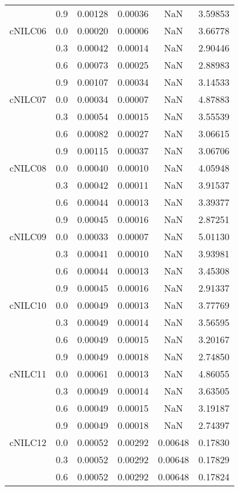 \begin{longtable}{cccccc}
        & 0.9 & 0.00128 & 0.00036 & NaN & 3.59853 \\
cNILC06 & 0.0 & 0.00020 & 0.00006 & NaN & 3.66778 \\
        & 0.3 & 0.00042 & 0.00014 & NaN & 2.90446 \\
        & 0.6 & 0.00073 & 0.00025 & NaN & 2.88983 \\
        & 0.9 & 0.00107 & 0.00034 & NaN & 3.14533 \\
cNILC07 & 0.0 & 0.00034 & 0.00007 & NaN & 4.87883 \\
        & 0.3 & 0.00054 & 0.00015 & NaN & 3.55539 \\
        & 0.6 & 0.00082 & 0.00027 & NaN & 3.06615 \\
        & 0.9 & 0.00115 & 0.00037 & NaN & 3.06706 \\
cNILC08 & 0.0 & 0.00040 & 0.00010 & NaN & 4.05948 \\
        & 0.3 & 0.00042 & 0.00011 & NaN & 3.91537 \\
        & 0.6 & 0.00044 & 0.00013 & NaN & 3.39377 \\
        & 0.9 & 0.00045 & 0.00016 & NaN & 2.87251 \\
cNILC09 & 0.0 & 0.00033 & 0.00007 & NaN & 5.01130 \\
        & 0.3 & 0.00041 & 0.00010 & NaN & 3.93981 \\
        & 0.6 & 0.00044 & 0.00013 & NaN & 3.45308 \\
        & 0.9 & 0.00045 & 0.00016 & NaN & 2.91337 \\
cNILC10 & 0.0 & 0.00049 & 0.00013 & NaN & 3.77769 \\
        & 0.3 & 0.00049 & 0.00014 & NaN & 3.56595 \\
        & 0.6 & 0.00049 & 0.00015 & NaN & 3.20167 \\
        & 0.9 & 0.00049 & 0.00018 & NaN & 2.74850 \\
cNILC11 & 0.0 & 0.00061 & 0.00013 & NaN & 4.86055 \\
        & 0.3 & 0.00049 & 0.00014 & NaN & 3.63505 \\
        & 0.6 & 0.00049 & 0.00015 & NaN & 3.19187 \\
        & 0.9 & 0.00049 & 0.00018 & NaN & 2.74397 \\
cNILC12 & 0.0 & 0.00052 & 0.00292 & 0.00648 & 0.17830 \\
        & 0.3 & 0.00052 & 0.00292 & 0.00648 & 0.17829 \\
        & 0.6 & 0.00052 & 0.00292 & 0.00648 & 0.17824 \\

\end{longtable}
